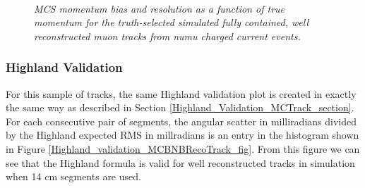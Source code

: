 \begin{figure}
\centering
\mbox{
	\quad
	}
\caption{\textit{MCS momentum bias and resolution as a function of true momentum for the truth-selected simulated fully contained, well reconstructed muon tracks from numu charged current events.}}
\label{MCS_true_bias_resolution_MCBNBRecoTrack_fig}
\end{figure}



\subsubsection{Highland Validation}\label{Highland_Validation_MCBNBRecoTrack_section}
For this sample of tracks, the same Highland validation plot is created in exactly the same way as described in Section \ref{Highland_Validation_MCTrack_section}. For each consecutive pair of segments, the angular scatter in milliradians divided by the Highland expected RMS in millradians is an entry in the histogram shown in Figure \ref{Highland_validation_MCBNBRecoTrack_fig}. From this figure we can see that the Highland formula is valid for well reconstructed tracks in simulation when 14 cm segments are used.


